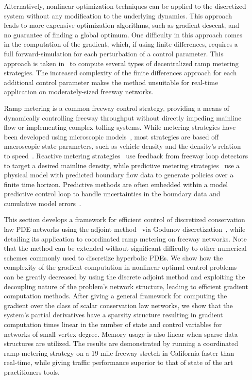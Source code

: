 Alternatively, nonlinear optimization techniques can be applied to the 
discretized system without any modification to the underlying dynamics. This 
approach leads to more expensive optimization algorithms, such as gradient 
descent, and no guarantee of finding a global optimum. One difficulty in this 
approach comes in the computation of the gradient, which, if using finite 
differences, requires a full forward-simulation for each perturbation of a 
control parameter. This approach is taken in~\cite{Ramon2013,Frejo2011} to 
compute several types of decentralized ramp metering strategies. The increased 
complexity of the finite differences approach for each additional control 
parameter makes the method unsuitable for real-time application on 
moderately-sized freeway networks.


Ramp metering is a common freeway control strategy, providing a means of 
dynamically controlling freeway throughput without directly impeding mainline 
flow or implementing complex tolling systems. While metering strategies have 
been developed using microscopic models~\cite{Ben-Akiva2003}, most strategies 
are based off macroscopic state parameters, such as vehicle density and the 
density's relation to 
speed~\cite{richards1956shock,lighthill1955kinematic,daganzo1995cell}. Reactive 
metering strategies~\cite{Papageorgiou1991,Papamichail,Kachroo2003} use 
feedback from freeway loop detectors to target a desired mainline density, 
while predictive metering 
strategies~\cite{Frejo2011,Kotsialos2004,gomes2006optimal,Chen1997} use a 
physical model with predicted boundary flow data to generate policies over a 
finite time horizon. Predictive methods are often embedded within a model 
predictive control loop to handle uncertainties in the boundary data and 
cumulative model errors~\cite{Muralidharana}.

This section develops a framework for efficient control of discretized 
conservation law PDE networks using the adjoint 
method~\cite{Giles2000,Pironneau1974} via Godunov 
discretization~\cite{godunov1959}, while detailing its application to 
coordinated ramp metering on freeway networks. Note that the method can be 
extended without significant difficulty to other numerical schemes commonly 
used to discretize hyperbolic PDEs. We show how the complexity of 
the gradient computation in nonlinear optimal control problems can be greatly 
decreased by using the discrete adjoint method and exploiting the decoupling 
nature of the problem's network structure, leading to efficient gradient 
computation methods. After giving a general framework for computing the gradient 
over the class of scalar conservation law networks, we show that the system's 
partial derivatives have a sparsity structure resulting in gradient computation 
times linear in the number of state and control variables for networks of small 
vertex degree. Memory usage is also linear when sparse data structures are utilized. The results are 
demonstrated by running a coordinated ramp metering strategy on a 19 mile 
freeway stretch in California faster than real-time, while giving traffic 
performance superior to that of state of the art practitioners tools.

